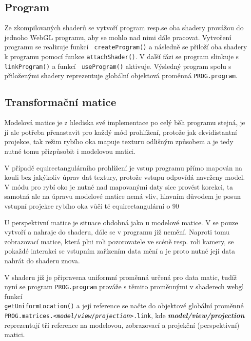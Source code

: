 \subsection{Program}
Ze zkompilovaných shaderů se vytvoří program resp.se oba shadery provážou  do jednoho WebGL programu, aby se mohlo nad nimi dále pracovat. Vytvoření programu se realizuje funkcí \texttt{ createProgram()} a následně se přiloží oba shadery k programu pomocí funkce \texttt{attachShader()}. V další fázi se program slinkuje s \texttt{linkProgram()} a funkcí \texttt{ useProgram()} aktivuje. Výsledný program spolu s přiloženými shadery reprezentuje globální objektová proměnná \texttt{PROG.program}.


\subsection{Transformační matice}
Modelová matice je z hlediska své implementace po celý běh programu stejná, je jí ale potřeba přenastavit pro každý mód prohlížení, protože jak ekvidistantní projekce, tak režim rybího oka mapuje texturu odlišným způsobem a je tedy nutné tomu přizpůsobit i modelovou matici.

V případě equirectangulárního prohlížení je vstup programu přímo mapován na kouli bez jakýkoliv úprav dat textury, protože vstupu odpovídá navrženy model. V módu pro rybí oko je nutné nad mapovanými daty sice provést korekci, ta samotná  ale na úpravu modelové matice nemá vliv, hlavním důvodem je posun vstupní projekce rybího oka vůči té equirectangulární o 90\degree

U perspektivní matice je situace obdobná jako u modelové matice. V \texttt{\setupProgram} se pouze vytvoří a nahraje do shaderu, dále se v programu již nemění. Naproti tomu zobrazovací matice, která plni roli pozorovatele ve scéně resp. roli kamery, se pokaždé interakci se vstupním zařízením data mění a je proto nutné její data nahrát do shaderu znova. 

V shaderu již je připravena uniformní proměnná určená pro data matic, tudíž nyní se program \texttt{PROG.program} prováže s těmito proměnnými v shaderech webgl funkcí \\\texttt{getUniformLocation()} a její reference se načte do objektové globální proměnné \\\texttt{PROG.matrices.\textit{<model/view/projection>}.link}, kde \textit{\textbf{model/view/projection}} reprezentují tří reference na modelovou, zobrazovací a projekční (perspektivní) matici.


